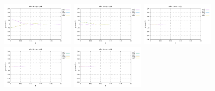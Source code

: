 \noindent
\includegraphics[width=3.5cm]{python_codes/fieldstone_152/RESULTS/exp1/qqq_32_m2}
\includegraphics[width=3.5cm]{python_codes/fieldstone_152/RESULTS/exp1/qqq_32_m3}
\includegraphics[width=3.5cm]{python_codes/fieldstone_152/RESULTS/exp1/qqq_32_m4}
\includegraphics[width=3.5cm]{python_codes/fieldstone_152/RESULTS/exp1/qqq_32_m5}
\includegraphics[width=3.5cm]{python_codes/fieldstone_152/RESULTS/exp1/qqq_32_m6}

